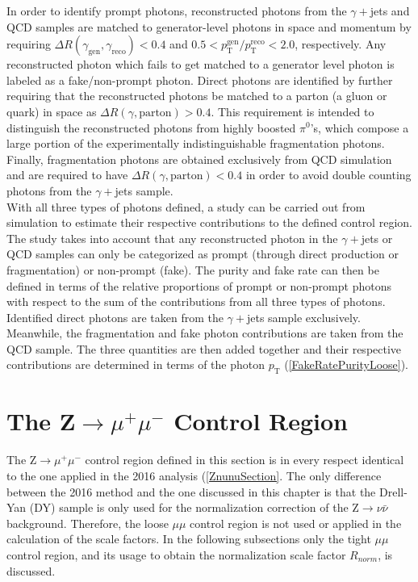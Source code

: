 In order to identify prompt photons, reconstructed photons from the $\gamma+$jets and QCD samples are matched to generator-level photons in space and momentum by requiring $\Delta R(\gamma_\text{gen},\gamma_\text{reco}) < 0.4$ and $0.5 < p_\text{T}^\text{gen}/p_\text{T}^\text{reco} < 2.0$, respectively. Any reconstructed photon which fails to get matched to a generator level photon is labeled as a fake/non-prompt photon. Direct photons are identified by further requiring that the reconstructed photons be matched to a parton (a gluon or quark) in space as $\Delta R(\gamma,\text{parton}) > 0.4$. This requirement is intended to distinguish the reconstructed photons from highly boosted $\pi^0$'s, which compose a large portion of the experimentally indistinguishable fragmentation photons. Finally, fragmentation photons are obtained exclusively from QCD simulation and are required to have $\Delta R(\gamma,\text{parton}) < 0.4$ in order to avoid double counting photons from the $\gamma+$jets sample.\\

With all three types of photons defined, a study can be carried out from simulation to estimate their respective contributions to the defined control region. The study takes into account that any reconstructed photon in the $\gamma+$jets or QCD samples can only be categorized as prompt (through direct production or fragmentation) or non-prompt (fake). The purity and fake rate can then be defined in terms of the relative proportions of prompt or non-prompt photons with respect to the sum of the contributions from all three types of photons. Identified direct photons are taken from the $\gamma+$jets sample exclusively. Meanwhile, the fragmentation and fake photon contributions are taken from the QCD sample. The three quantities are then added together and their respective contributions are determined in terms of the photon $p_\text{T}$ (\autoref{FakeRatePurityLoose}).

\section{The Z$\rightarrow\mu^{+}\mu^{-}$ Control Region}

The Z$\rightarrow\mu^{+}\mu^{-}$ control region defined in this section is in every respect identical to the one applied in the 2016 analysis (\autoref{ZnunuSection}. The only difference between the 2016 method and the one discussed in this chapter is that the Drell-Yan (DY) sample is only used for the normalization correction of the Z$\rightarrow\nu\bar{\nu}$ background. Therefore, the loose $\mu\mu$ control region is not used or applied in the calculation of the scale factors. In the following subsections only the tight $\mu\mu$ control region, and its usage to obtain the normalization scale factor $R_{norm}$, is discussed.

